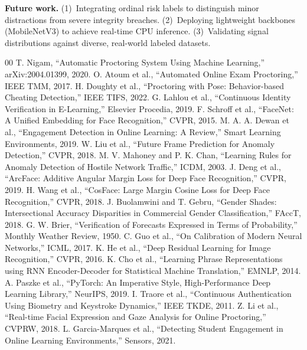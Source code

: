 \documentclass[conference]{IEEEtran}
\begin{document}
\textbf{Future work.} (1)~Integrating ordinal risk labels to distinguish minor distractions from severe integrity breaches. (2)~Deploying lightweight backbones (MobileNetV3) to achieve real-time CPU inference. (3)~Validating signal distributions against diverse, real-world labeled datasets.

\begin{thebibliography}{00}
 T. Nigam, ``Automatic Proctoring System Using Machine Learning,'' arXiv:2004.01399, 2020.
 O. Atoum et al., ``Automated Online Exam Proctoring,'' IEEE TMM, 2017.
 H. Doughty et al., ``Proctoring with Pose: Behavior-based Cheating Detection,'' IEEE TIFS, 2022.
 G. Lahlou et al., ``Continuous Identity Verification in E-Learning,'' Elsevier Procedia, 2019.
 F. Schroff et al., ``FaceNet: A Unified Embedding for Face Recognition,'' CVPR, 2015.
 M. A. A. Dewan et al., ``Engagement Detection in Online Learning: A Review,'' Smart Learning Environments, 2019.
 W. Liu et al., ``Future Frame Prediction for Anomaly Detection,'' CVPR, 2018.
 M. V. Mahoney and P. K. Chan, ``Learning Rules for Anomaly Detection of Hostile Network Traffic,'' ICDM, 2003.
 J. Deng et al., ``ArcFace: Additive Angular Margin Loss for Deep Face Recognition,'' CVPR, 2019.
 H. Wang et al., ``CosFace: Large Margin Cosine Loss for Deep Face Recognition,'' CVPR, 2018.
 J. Buolamwini and T. Gebru, ``Gender Shades: Intersectional Accuracy Disparities in Commercial Gender Classification,'' FAccT, 2018.
 G. W. Brier, ``Verification of Forecasts Expressed in Terms of Probability,'' Monthly Weather Review, 1950.
 C. Guo et al., ``On Calibration of Modern Neural Networks,'' ICML, 2017.
 K. He et al., ``Deep Residual Learning for Image Recognition,'' CVPR, 2016.
 K. Cho et al., ``Learning Phrase Representations using RNN Encoder-Decoder for Statistical Machine Translation,'' EMNLP, 2014.
 A. Paszke et al., ``PyTorch: An Imperative Style, High-Performance Deep Learning Library,'' NeurIPS, 2019.
 I. Traore et al., ``Continuous Authentication Using Biometry and Keystroke Dynamics,'' IEEE TKDE, 2011.
 Z. Li et al., ``Real-time Facial Expression and Gaze Analysis for Online Proctoring,'' CVPRW, 2018.
 L. Garcia-Marques et al., ``Detecting Student Engagement in Online Learning Environments,'' Sensors, 2021.
\end{thebibliography}
\end{document}
